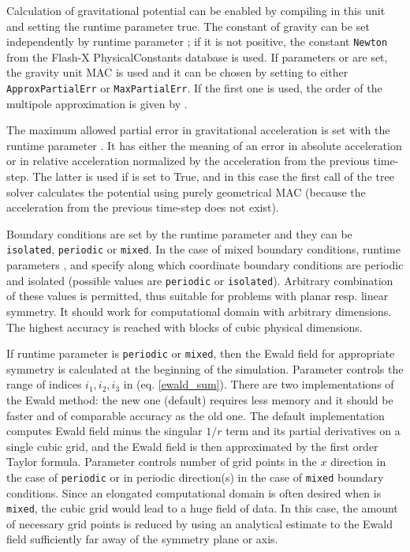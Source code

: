 Calculation of gravitational potential can be enabled by compiling in this unit
and setting the runtime parameter  true. The constant of gravity
can be set independently by runtime parameter ; if it is
not positive, the constant \texttt{Newton} from the Flash-X \unit{PhysicalConstants}
database is used. If parameters  or 
are set, the gravity unit MAC is used and it can be chosen by setting
 to either \texttt{ApproxPartialErr} or \texttt{MaxPartialErr}.
If the first one is used, the order of the multipole approximation is given by
.

The maximum allowed partial error in gravitational acceleration is set with the
runtime parameter . It has either the meaning of an error in
absolute acceleration or in relative acceleration normalized by the acceleration
from the previous time-step. The latter is used if  is
set to True, and in this case the first call of the tree solver calculates the
potential using purely geometrical MAC (because the acceleration from the
previous time-step does not exist).

Boundary conditions are set by the runtime parameter  and they
can be \texttt{isolated}, \texttt{periodic} or \texttt{mixed}.
In the case of mixed boundary conditions, runtime parameters ,
 and  specify
along which coordinate boundary conditions are periodic and isolated
(possible values are \texttt{periodic} or \texttt{isolated}).
Arbitrary combination of these values is permitted, thus suitable for problems
with planar resp. linear symmetry. It should work for computational domain with
arbitrary dimensions. The highest accuracy is reached with blocks of cubic physical
dimensions.

If runtime parameter  is \texttt{periodic} or
\texttt{mixed}, then the Ewald field for appropriate symmetry is calculated at
the beginning of the simulation. Parameter  controls the range of indices
$i_1,i_2,i_3$ in (eq. \ref{ewald_sum}). There are two implementations of the
Ewald method: the new one (default) requires less memory and it should be faster
and of comparable accuracy as the old one. The default implementation computes
Ewald field minus the singular $1/r$ term and its partial derivatives on a
single cubic grid, and the Ewald field is then approximated by the first order
Taylor formula. Parameter  controls number of grid points
in the $x$ direction in the case of \texttt{periodic} or in periodic
direction(s) in the case of \texttt{mixed} boundary conditions. Since an
elongated computational domain is often desired when 
is \texttt{mixed}, the cubic grid would lead to a huge field of data. In this
case, the amount of necessary grid points is reduced by using an analytical
estimate to the Ewald field sufficiently far away of the symmetry plane or axis.

